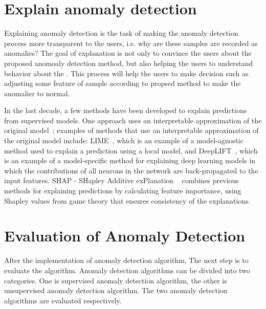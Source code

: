 \section{Explain anomaly detection}
\label{sec-explain_anomaly}
Explaining anomaly detection is the task of making
the anomaly detection process more transparent to the users,
i.e. why are these samples are recorded as anomalies?
The  goal of explanation is not only to
convince the users about the proposed anomoaly detection method,
but also helping the users to understand behavior about
the .
This process will help the users to make decision such as
adjusting some feature of sample according to propsed method to
make the anomalier to normal.

In the last decade,
a few methods have been developed to explain predictions
from supervised models.
One approach uses an interpretable approximation of
the original model~\cite{lundberg2017unified};
examples of methods that
use an interpretable approximation
of the original model include: LIME~\cite{ribeiro2016should},
which is an example of a
model-agnostic method used to
explain a prediction using a local model,
and DeepLIFT~\cite{shrikumar2017learning},
which is an example of a model-specific method for explaining
deep learning models in which
the contributions of all neurons in the network are
back-propagated to the input features.
SHAP - SHapley Additive exPlanation ~\cite{lundberg2017unified}
combines previous methods for
explaining predictions by calculating feature
importance,
using Shapley values from
game theory that ensures consistency of
the explanations.




\section{Evaluation of Anomaly Detection}

After the implementation of anomaly detection algorithm,
The next step is to evaluate the algorithm. 
Anomaly detection algorithms can be divided into two categories. 
One is supervised anomaly detection algorithm, 
the other is unsupervised anomaly detection algorithm.
The two anomaly detection algorithms are evaluated respectively.


